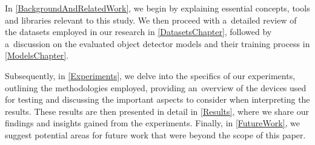 In \autoref{BackgroundAndRelatedWork}, we begin by explaining essential
concepts, tools and libraries relevant to this study. We then proceed with
a~detailed review of the datasets employed in our research in
\autoref{DatasetsChapter}, followed by a~discussion on the evaluated object
detector models and their training process in \autoref{ModelsChapter}.

Subsequently, in \autoref{Experiments}, we delve into the specifics of our
experiments, outlining the methodologies employed, providing an~overview of the
devices used for testing and discussing the important aspects to consider when
interpreting the results. These results are then presented in detail in
\autoref{Results}, where we share our findings and insights gained from the
experiments. Finally, in \autoref{FutureWork}, we suggest potential areas for
future work that were beyond the scope of this paper.



